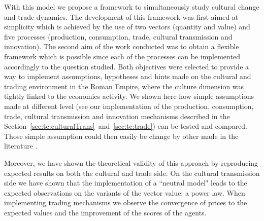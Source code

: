 \documentclass[a4paper]{article}
\begin{document}
With this model we propose a framework to simultaneously study cultural change and trade dynamics. The development of this framework was first aimed at simplicity which is achieved by the use of two vectors (quantity and value) and five processes (production, consumption, trade, cultural transmission and innovation). 
The second aim of the work conducted was to obtain a flexible framework which is possible since each of the processes can be implemented accordingly to the question studied. Both objectives were selected to provide a way to implement assumptions, hypotheses and hints made on the cultural and trading environment in the Roman Empire, where the culture dimension was tightly linked to the economics activity. We shown here how simple assumptions made at different level (see our implementation of the production, consumption, trade, cultural transmission and innovation mechanisms described in the Section~\ref{sec:tc:culturalTrans}~and~\ref{sec:tc:trade}) can be tested and compared. Those simple assumption could then easily be change by other made in the literature \cite{verboven2015structureandperformanceintheromaneconomymodelsmethodsandcasestudies}.

Moreover, we have shown the theoretical validity of this approach by reproducing expected results on both the cultural and trade side. On the cultural transmission side we have shown that the implementation of a ``neutral model" leads to the expected observations on the variants of the vector value: a power law. When implementing trading mechanisms we observe the convergence of prices to the expected values and the improvement of the scores of the agents.
\end{document}

